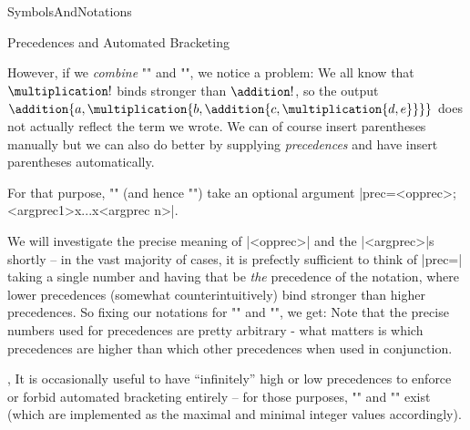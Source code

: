 \begin{smodule}[ns=https://github.com/slatex/sTeX/doc]{SymbolsAndNotations}
\begin{sfragment}{Precedences and Automated Bracketing}

    However, if we \emph{combine} \stexcode"\addition" and
    \stexcode"\multiplication", we notice a problem:
    We all know that $\multiplication!$ binds stronger than $\addition!$,
    so the output $\addition{a,\multiplication{b,\addition{c,\multiplication{d,e}}}}$
    does not actually reflect the term we wrote. We can of course
    insert parentheses manually
    but we can also do better by supplying \emph{precedences} and
    have \sTeX insert parentheses automatically.

    For that purpose, \stexcode"\notation" (and hence \stexcode"\symdef")
    take an optional argument |prec=<opprec>;<argprec1>x...x<argprec n>|.

    We will investigate the precise meaning of |<opprec>| and the
    |<argprec>|s shortly -- in the vast majority of cases, it is
    prefectly sufficient to think of |prec=| taking a single number
    and having that be \emph{the} precedence of the notation,
    where lower precedences 
    (somewhat counterintuitively) bind stronger than higher precedences.
    So fixing our notations for \stexcode"\addition" and
    \stexcode"\multiplication", we get:
    Note that the precise numbers used for precedences are pretty
    arbitrary - what matters is which precedences are higher than
    which other precedences when used in conjunction.
    \begin{variable}{\infprec,\neginfprec}
        It is occasionally useful to have ``infinitely'' high
        or low precedences to enforce or forbid
        automated bracketing entirely -- for those purposes,
        \stexcode"\infprec"
        and \stexcode"\neginfprec" exist (which are implemented
        as the maximal and minimal integer values accordingly).
    \end{variable}


\end{sfragment}
\end{smodule}
